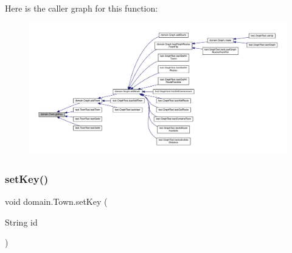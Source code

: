 Here is the caller graph for this function\+:\nopagebreak
\begin{figure}[H]
\begin{center}
\leavevmode
\includegraphics[width=350pt]{classdomain_1_1_town_a4d9996c44520ba3639163348b1c1d2ca_icgraph}
\end{center}
\end{figure}
\mbox{\label{classdomain_1_1_town_abc867cf10f6b9c2f7191317456071ce7}} 
\subsubsection{\texorpdfstring{set\+Key()}{setKey()}}
{\footnotesize\ttfamily void domain.\+Town.\+set\+Key (\begin{DoxyParamCaption}\item[{String}]{id }\end{DoxyParamCaption})}

